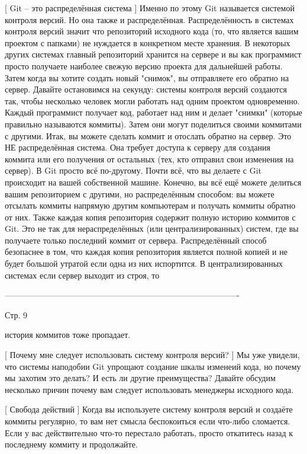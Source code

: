[ Git -- это распределённая система ]
Именно по этому Git называется системой контроля версий. Но она также и
распределённая. Распределённость в системах контроля версий значит что репозиторий
исходного кода (то, что является вашим проектом с папками) не нуждается в конкретном
месте хранения. В некоторых других системах главный репозиторий хранится на сервере
и вы как программист просто получаете наиболее свежую версию проекта для дальнейшей
работы. Затем когда вы хотите создать новый "снимок", вы отправляете его обратно на
сервер.
Давайте остановимся на секунду: системы контроля версий создаются так, чтобы
несколько человек могли работать над одним проектом одновременно. Каждый программист
получает код, работает над ним и делает "снимки" (которые правильно называются 
коммиты). Затем они могут поделиться своими коммитами с другими.
Итак, вы можете сделать коммит и отослать обратно на сервер. Это НЕ распределённая
система. Она требует доступа к серверу для создания коммита или его получения от
остальных (тех, кто отправил свои изменения на сервер). В Git просто всё по-другому.
Почти всё, что вы делаете с Git происходит на вашей собственной машине. Конечно, вы
всё ещё можете делиться вашим репозиторием с другими, но распределённым способом:
вы можете отсылать коммиты напрямую другим компьютерам и получать коммиты обратно от
них. Также каждая копия репозитория содержит полную историю коммитов с Git. Это не
так для нераспределённых (или централизированных) систем, где вы получаете только
последний коммит от сервера. Распределённый способ безопаснее в том, что каждая
копия репозитория является полной копией и не будет большой утратой если одна из
них испортится. В централизированных системах если сервер выходит из строя, то

-------------------------------------------------------------------------------------

Стр. 9

история коммитов тоже пропадает.

[ Почему мне следует использовать систему контроля версий? ]
Мы уже увидели, что системы наподобии Git упрощают создание шкалы изменеий кода, но
почему мы захотим это делать? И есть ли другие преимущества? Давайте обсудим
несколько причин почему вам следует использовать менеджеры исходного кода.

[ Свобода действий ]
Когда вы используете систему контроля версий и создаёте коммиты регулярно, то вам нет
смысла беспокоиться если что-либо сломается. Если у вас действительно что-то
перестало работать, просто откатитесь назад к последнему коммиту и продолжайте.

